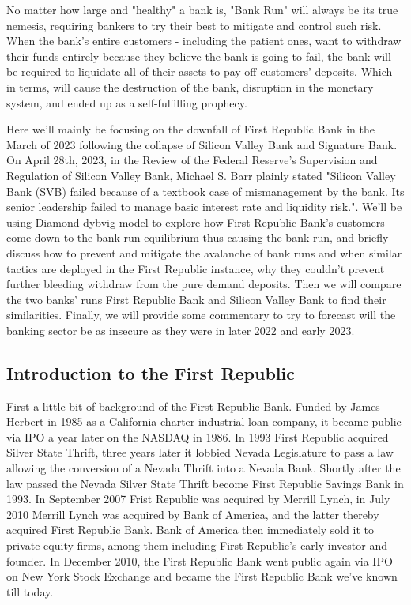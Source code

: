 \documentclass[a4paper]{article}
\begin{document}
No matter how large and "healthy" a bank is, "Bank Run" will always be its true nemesis, requiring bankers to try their best to mitigate and control such risk. When the bank's entire customers - including the patient ones, want to withdraw their funds entirely because they believe the bank is going to fail, the bank will be required to liquidate all of their assets to pay off customers' deposits. Which in terms, will cause the destruction of the bank, disruption in the monetary system, and ended up as a self-fulfilling prophecy. 

Here we'll mainly be focusing on the downfall of First Republic Bank in the March of 2023 following the collapse of Silicon Valley Bank and Signature Bank. On April 28th, 2023, in the Review of the Federal Reserve’s Supervision and Regulation of Silicon Valley
Bank, Michael S. Barr plainly stated "Silicon Valley Bank (SVB) failed because of a textbook case of mismanagement by the
bank. Its senior leadership failed to manage basic interest rate and liquidity risk.". We'll be using Diamond-dybvig model to explore how First Republic Bank's customers come down to the bank run equilibrium thus causing the bank run, and briefly discuss how to prevent and mitigate the avalanche of bank runs and when similar tactics are deployed in the First Republic instance, why they couldn't prevent further bleeding withdraw from the pure demand deposits. Then we will compare the two banks' runs First Republic Bank and Silicon Valley Bank to find their similarities. Finally, we will provide some commentary to try to forecast will the banking sector be as insecure as they were in later 2022 and early 2023. 

\subsection{Introduction to the First Republic}
\label{Introduction to the First Republic}
\vspace{-0.25cm}

\quad \quad First a little bit of background of the First Republic Bank. Funded by James Herbert in 1985 as a California-charter industrial loan company, it became public via IPO a year later on the NASDAQ in 1986. In 1993 First Republic acquired Silver State Thrift, three years later it lobbied Nevada Legislature to pass a law allowing the conversion of a Nevada Thrift into a Nevada Bank. Shortly after the law passed the Nevada Silver State Thrift become First Republic Savings Bank in 1993. In September 2007 Frist Republic was acquired by Merrill Lynch, in July 2010 Merrill Lynch was acquired by Bank of America, and the latter thereby acquired First Republic Bank. Bank of America then immediately sold it to private equity firms, among them including First Republic's early investor and founder. In December 2010, the First Republic Bank went public again via IPO on New York Stock Exchange and became the First Republic Bank we've known till today.
\end{document}
